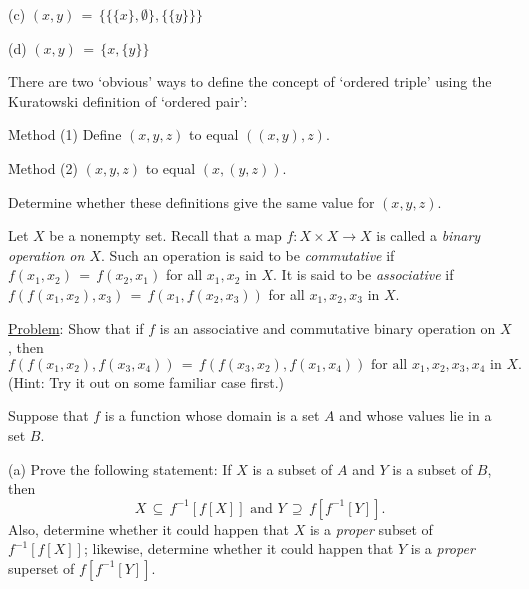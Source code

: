 
\V
 
        (c) $(x,y) \,=\, \{ \{\{x\},{\emptyset}\}, \{\{y\}\}\}$
        

\V
        (d) $(x,y) \,=\, \{x,\{y\}\}$
        

\V
\V

\noindent \ExAf There are two `obvious' ways to define the concept of `ordered triple' using the Kuratowski definition of `ordered pair':

    \h Method (1) Define $(x,y,z)$ to equal  $((x,y),z)$.

    \h Method (2) $(x,y,z)$ to equal $(x,(y,z))$.
    
\noindent Determine whether these definitions give the same value for $(x,y,z)$.

\V
\V

\noindent \ExAg Let $X$ be a nonempty set.
    Recall that a map $f:X{\times}X {\rightarrow} X$ is called a {\em binary operation on $X$}.
    Such an operation is said to be {\em commutative} if $f(x_{1},x_{2}) \,=\, f(x_{2},x_{1})$ for all $x_{1},x_{2}$ in $X$.
    It is said to be {\em associative} if $f(f(x_{1},x_{2}),x_{3}) \,=\, f(x_{1},f(x_{2},x_{3}))$ for all $x_{1},x_{2},x_{3}$ in $X$.

        \underline{Problem}: Show that if $f$ is an associative and commutative binary operation on $X$,
    then
        \begin{displaymath}
        f(f(x_{1},x_{2}),f(x_{3},x_{4})) \,=\, f(f(x_{3},x_{2}),f(x_{1},x_{4}))
    \mbox{ for all $x_{1},x_{2},x_{3},x_{4}$ in $X$}.
        \end{displaymath}
    (Hint: Try it out on some familiar case first.)


\V
\V


\noindent \ExAh Suppose that $f$ is a function whose domain is a set $A$ and whose values lie in a set $B$.

\V

        (a) Prove the following statement: If $X$ is a subset of $A$ and $Y$ is a subset of $B$, then
        \begin{displaymath}
        X \,{\subseteq}\, f^{-1}[f[X]] \mbox{ and } Y \,{\supseteq}\, f[f^{-1}[Y]].
        \end{displaymath}
    Also, determine whether it could happen that $X$ is a {\em proper} subset of $f^{-1}[f[X]]$;
    likewise, determine whether it could happen that $Y$ is a {\em proper} superset of $f[f^{-1}[Y]]$.

